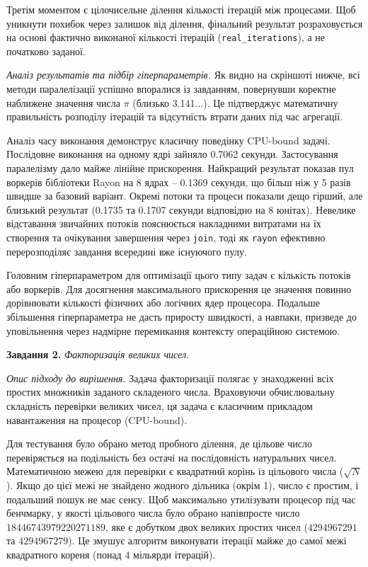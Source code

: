 \documentclass[14pt, a4paper]{extreport}
\begin{document}
	Третім моментом є цілочисельне ділення кількості ітерацій між процесами. Щоб уникнути похибок через залишок від ділення, фінальний результат розраховується на основі фактично виконаної кількості ітерацій (\texttt{real\_iterations}), а не початково заданої.
	
	\textit{Аналіз результатів та підбір гіперпараметрів.}
	Як видно на скріншоті нижче, всі методи паралелізації успішно впоралися із завданням, повернувши коректне наближене значення числа $\pi$ (близько 3.141...). Це підтверджує математичну правильність розподілу ітерацій та відсутність втрати даних під час агрегації. 
	
	
	Аналіз часу виконання демонструє класичну поведінку CPU-bound задачі. Послідовне виконання на одному ядрі зайняло 0.7062 секунди. Застосування паралелізму дало майже лінійне прискорення. Найкращий результат показав пул воркерів бібліотеки Rayon на 8 ядрах -- 0.1369 секунди, що більш ніж у 5 разів швидше за базовий варіант. Окремі потоки та процеси показали дещо гірший, але близький результат (0.1735 та 0.1707 секунди відповідно на 8 юнітах). Невелике відставання звичайних потоків пояснюється накладними витратами на їх створення та очікування завершення через \texttt{join}, тоді як \texttt{rayon} ефективно перерозподіляє завдання всередині вже існуючого пулу.
	
	
	Головним гіперпараметром для оптимізації цього типу задач є кількість потоків або воркерів. Для досягнення максимального прискорення це значення повинно дорівнювати кількості фізичних або логічних ядер процесора. Подальше збільшення гіперпараметра не дасть приросту швидкості, а навпаки, призведе до уповільнення через надмірне перемикання контексту операційною системою.
	
	\textbf{Завдання 2.} \textit{Факторизація великих чисел.}
	
	\textit{Опис підходу до вирішення.}
	Задача факторизації полягає у знаходженні всіх простих множників заданого складеного числа. Враховуючи обчислювальну складність перевірки великих чисел, ця задача є класичним прикладом навантаження на процесор (CPU-bound). 
	
	Для тестування було обрано метод пробного ділення, де цільове число перевіряється на подільність без остачі на послідовність натуральних чисел. Математичною межею для перевірки є квадратний корінь із цільового числа ($ \sqrt{N} $). Якщо до цієї межі не знайдено жодного дільника (окрім 1), число є простим, і подальший пошук не має сенсу. Щоб максимально утилізувати процесор під час бенчмарку, у якості цільового числа було обрано напівпросте число $18446743979220271189$, яке є добутком двох великих простих чисел ($4294967291$ та $4294967279$). Це змушує алгоритм виконувати ітерації майже до самої межі квадратного кореня (понад 4 мільярди ітерацій).
	
\end{document}
